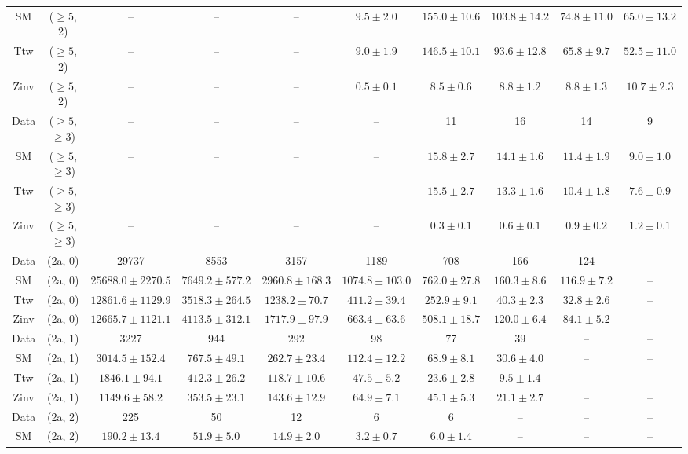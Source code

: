 \begin{table}[h!]
{\begin{tabular}{cccccccccc}
	SM & ($\ge5$, 2) & -- & -- & -- & $9.5\pm 2.0$ & $155.0\pm 10.6$ & $103.8\pm 14.2$ & $74.8\pm 11.0$ & $65.0\pm 13.2$ \\[0.5ex] 
	Ttw & ($\ge5$, 2) & -- & -- & -- & $9.0\pm 1.9$ & $146.5\pm 10.1$ & $93.6\pm 12.8$ & $65.8\pm 9.7$ & $52.5\pm 11.0$ \\[0.5ex] 
	Zinv & ($\ge5$, 2) & -- & -- & -- & $0.5\pm 0.1$ & $8.5\pm 0.6$ & $8.8\pm 1.2$ & $8.8\pm 1.3$ & $10.7\pm 2.3$ \\[0.5ex] 
	Data & ($\ge5$, $\ge3$) & -- & -- & -- & -- & 11 & 16 & 14 & 9 \\[0.5ex] 
	SM & ($\ge5$, $\ge3$) & -- & -- & -- & -- & $15.8\pm 2.7$ & $14.1\pm 1.6$ & $11.4\pm 1.9$ & $9.0\pm 1.0$ \\[0.5ex] 
	Ttw & ($\ge5$, $\ge3$) & -- & -- & -- & -- & $15.5\pm 2.7$ & $13.3\pm 1.6$ & $10.4\pm 1.8$ & $7.6\pm 0.9$ \\[0.5ex] 
	Zinv & ($\ge5$, $\ge3$) & -- & -- & -- & -- & $0.3\pm 0.1$ & $0.6\pm 0.1$ & $0.9\pm 0.2$ & $1.2\pm 0.1$ \\[0.5ex] 
	Data & (2a, 0) & 29737 & 8553 & 3157 & 1189 & 708 & 166 & 124 & -- \\[0.5ex] 
	SM & (2a, 0) & $25688.0\pm 2270.5$ & $7649.2\pm 577.2$ & $2960.8\pm 168.3$ & $1074.8\pm 103.0$ & $762.0\pm 27.8$ & $160.3\pm 8.6$ & $116.9\pm 7.2$ & -- \\[0.5ex] 
	Ttw & (2a, 0) & $12861.6\pm 1129.9$ & $3518.3\pm 264.5$ & $1238.2\pm 70.7$ & $411.2\pm 39.4$ & $252.9\pm 9.1$ & $40.3\pm 2.3$ & $32.8\pm 2.6$ & -- \\[0.5ex] 
	Zinv & (2a, 0) & $12665.7\pm 1121.1$ & $4113.5\pm 312.1$ & $1717.9\pm 97.9$ & $663.4\pm 63.6$ & $508.1\pm 18.7$ & $120.0\pm 6.4$ & $84.1\pm 5.2$ & -- \\[0.5ex] 
	Data & (2a, 1) & 3227 & 944 & 292 & 98 & 77 & 39 & -- & -- \\[0.5ex] 
	SM & (2a, 1) & $3014.5\pm 152.4$ & $767.5\pm 49.1$ & $262.7\pm 23.4$ & $112.4\pm 12.2$ & $68.9\pm 8.1$ & $30.6\pm 4.0$ & -- & -- \\[0.5ex] 
	Ttw & (2a, 1) & $1846.1\pm 94.1$ & $412.3\pm 26.2$ & $118.7\pm 10.6$ & $47.5\pm 5.2$ & $23.6\pm 2.8$ & $9.5\pm 1.4$ & -- & -- \\[0.5ex] 
	Zinv & (2a, 1) & $1149.6\pm 58.2$ & $353.5\pm 23.1$ & $143.6\pm 12.9$ & $64.9\pm 7.1$ & $45.1\pm 5.3$ & $21.1\pm 2.7$ & -- & -- \\[0.5ex] 
	Data & (2a, 2) & 225 & 50 & 12 & 6 & 6 & -- & -- & -- \\[0.5ex] 
	SM & (2a, 2) & $190.2\pm 13.4$ & $51.9\pm 5.0$ & $14.9\pm 2.0$ & $3.2\pm 0.7$ & $6.0\pm 1.4$ & -- & -- & -- \\[0.5ex] 

\end{tabular}}
\end{table}
